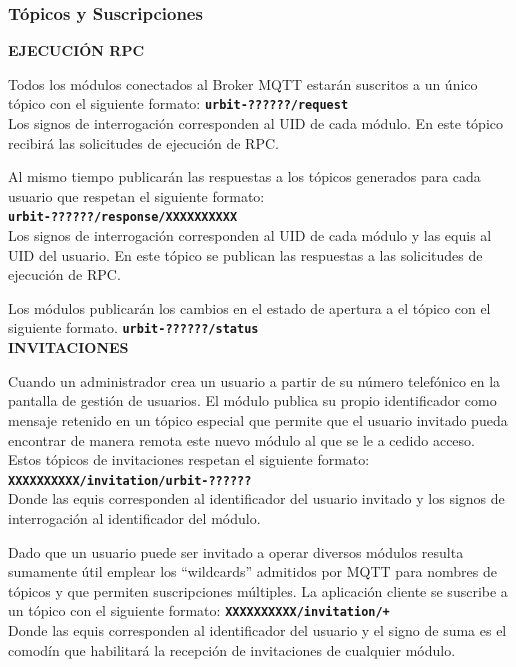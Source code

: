 \subsubsection{Tópicos y Suscripciones}
\textbf{EJECUCIÓN RPC}

Todos los módulos conectados al Broker MQTT estarán suscritos a un único tópico con el siguiente formato:
\textbf{\texttt{urbit-??????/request}}\\
Los signos de interrogación corresponden al UID de cada módulo. En este tópico recibirá las solicitudes de ejecución de RPC.

Al mismo tiempo publicarán las respuestas a los tópicos generados para cada usuario que respetan el siguiente formato:\\
\textbf{\texttt{urbit-??????/response/XXXXXXXXXX}}\\
Los signos de interrogación corresponden al UID de cada módulo y las equis al UID del usuario. En este tópico se publican las respuestas a las solicitudes de ejecución de RPC.

Los módulos publicarán los cambios en el estado de apertura a el tópico con el siguiente formato.
\textbf{\texttt{urbit-??????/status}}\\

\textbf{INVITACIONES}

Cuando un administrador crea un usuario a partir de su número telefónico en la pantalla de gestión de usuarios. El módulo publica su propio identificador como mensaje retenido en un tópico especial que permite que el usuario invitado pueda encontrar de manera remota este nuevo módulo al que se le a cedido acceso.
Estos tópicos de invitaciones respetan el siguiente formato:\\
\textbf{\texttt{XXXXXXXXXX/invitation/urbit-??????}}\\
Donde las equis corresponden al identificador del usuario invitado y los signos de interrogación al identificador del módulo.

Dado que un usuario puede ser invitado a operar diversos módulos resulta sumamente útil emplear los ``wildcards'' admitidos por MQTT para nombres de tópicos y que permiten suscripciones múltiples. La aplicación cliente se suscribe a un tópico con el siguiente formato:
\textbf{\texttt{XXXXXXXXXX/invitation/+}}\\
Donde las equis corresponden al identificador del usuario y el signo de suma es el comodín que habilitará la recepción de invitaciones de cualquier módulo.

